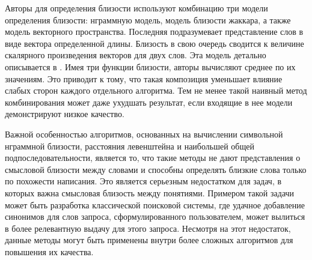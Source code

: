 Авторы \cite{Shirude} для определения близости используют комбинацию три модели определения близости: нграммную модель, модель близости жаккара, а также модель векторного пространства. Последняя подразумевает представление слов в виде вектора определенной длины. Близость в свою очередь сводится к величине скалярного произведения векторов для двух слов. Эта модель детально описывается в \cite{vector_space}. Имея три функции близости, авторы вычисляют среднее по их значениям. Это приводит к тому, что такая композиция уменьшает влияние слабых сторон каждого отдельного алгоритма. Тем не менее такой наивный метод комбинирования может даже ухудшать результат, если входящие в нее модели демонстрируют низкое качество.

Важной особенностью алгоритмов, основанных на вычислении символьной нграммной близости, расстояния левенштейна и наибольшей общей подпоследовательности, является то, что такие методы не дают представления о смысловой близости между словами и способны определять близкие слова только по похожести написания. Это является серьезным недостатком для задач, в которых важна смысловая близость между понятиями. Примером такой задачи может быть разработка классической поисковой системы, где удачное добавление синонимов для слов запроса, сформулированного пользователем, может вылиться в более релевантную выдачу для этого запроса.  Несмотря на этот недостаток, данные методы могут быть применены внутри более сложных алгоритмов для повышения их качества.

